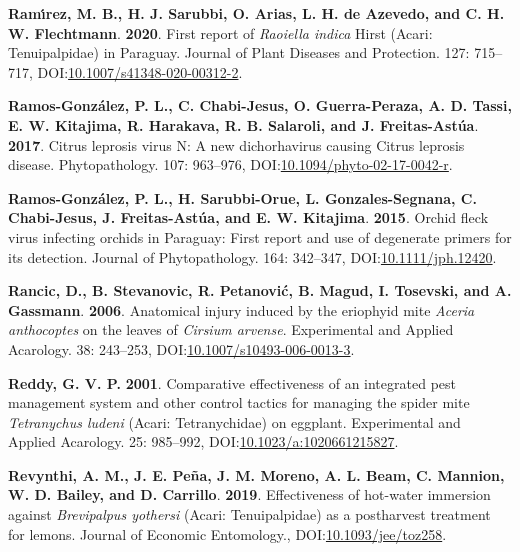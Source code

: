 \documentclass[12pt,final,CPage]{ufthesis}
\newlength{\cslhangindent}
\newenvironment{CSLReferences}[2] %
{%
	\setlength{\parindent}{0pt}
	\ifodd #1 \everypar{\setlength{\hangindent}{\cslhangindent}}\ignorespaces\fi
	\ifnum #2 > 0
	\setlength{\parskip}{#2\baselineskip}
	\fi
}%
{}
\begin{document}
{\begin{CSLReferences}{1}{0}
  \leavevmode{}%
  \textbf{Ramı́rez, M. B., H. J. Sarubbi, O. Arias, L. H. de Azevedo, and C. H. W. Flechtmann}. \textbf{2020}. First report of {\emph{Raoiella indica}} {Hirst} ({Acari}: {Tenuipalpidae}) in {Paraguay}. Journal of Plant Diseases and Protection. 127: 715--717, DOI:\href{https://doi.org/10.1007/s41348-020-00312-2}{10.1007/s41348-020-00312-2}.

  \leavevmode{}%
  \textbf{Ramos-González, P. L., C. Chabi-Jesus, O. Guerra-Peraza, A. D. Tassi, E. W. Kitajima, R. Harakava, R. B. Salaroli, and J. Freitas-Astúa}. \textbf{2017}. {Citrus leprosis virus} {N}: A new dichorhavirus causing {Citrus leprosis} disease. Phytopathology{\textregistered}. 107: 963--976, DOI:\href{https://doi.org/10.1094/phyto-02-17-0042-r}{10.1094/phyto-02-17-0042-r}.

  \leavevmode{}%
  \textbf{Ramos-González, P. L., H. Sarubbi-Orue, L. Gonzales-Segnana, C. Chabi-Jesus, J. Freitas-Astúa, and E. W. Kitajima}. \textbf{2015}. {Orchid fleck virus} infecting orchids in {Paraguay}: First report and use of degenerate primers for its detection. Journal of Phytopathology. 164: 342--347, DOI:\href{https://doi.org/10.1111/jph.12420}{10.1111/jph.12420}.

  \leavevmode{}%
  \textbf{Rancic, D., B. Stevanovic, R. Petanović, B. Magud, I. Tosevski, and A. Gassmann}. \textbf{2006}. Anatomical injury induced by the eriophyid mite {\emph{Aceria anthocoptes}} on the leaves of {\emph{Cirsium arvense}}. Experimental and Applied Acarology. 38: 243--253, DOI:\href{https://doi.org/10.1007/s10493-006-0013-3}{10.1007/s10493-006-0013-3}.

  \leavevmode{}%
  \textbf{Reddy, G. V. P.} \textbf{2001}. Comparative effectiveness of an integrated pest management system and other control tactics for managing the spider mite {\emph{Tetranychus ludeni}} {(Acari: Tetranychidae)} on eggplant. Experimental and Applied Acarology. 25: 985--992, DOI:\href{https://doi.org/10.1023/a:1020661215827}{10.1023/a:1020661215827}.

  \leavevmode{}%
  \textbf{Revynthi, A. M., J. E. Peña, J. M. Moreno, A. L. Beam, C. Mannion, W. D. Bailey, and D. Carrillo}. \textbf{2019}. Effectiveness of hot-water immersion against {\emph{Brevipalpus yothersi}} ({Acari}: {Tenuipalpidae}) as a postharvest treatment for lemons. Journal of Economic Entomology., DOI:\href{https://doi.org/10.1093/jee/toz258}{10.1093/jee/toz258}.


\end{CSLReferences}}
\end{document}
